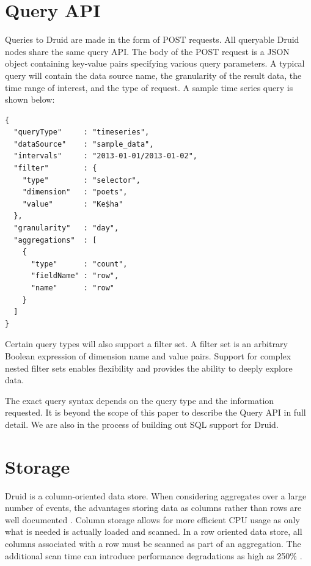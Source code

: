 \documentclass{vldb}
\begin{document}
\section{Query API}
\label{sec:query-api}
Queries to Druid are made in the form of POST requests. All queryable
Druid nodes share the same query API. The body of the POST request is
a JSON object containing key-value pairs specifying various query
parameters. A typical query will contain the data source name, the
granularity of the result data, the time range of interest, and the
type of request.  A sample time series query is shown below:
\begin{verbatim}
{
  "queryType"     : "timeseries",
  "dataSource"    : "sample_data",
  "intervals"     : "2013-01-01/2013-01-02",
  "filter"        : {
    "type"        : "selector",
    "dimension"   : "poets",
    "value"       : "Ke$ha"
  },
  "granularity"   : "day",
  "aggregations"  : [
    {
      "type"      : "count",
      "fieldName" : "row",
      "name"      : "row"
    }
  ]
}
\end{verbatim}

Certain query types will also support a filter set. A filter set is an
arbitrary Boolean expression of dimension name and value
pairs. Support for complex nested filter sets enables flexibility and
provides the ability to deeply explore data.

The exact query syntax depends on the query type and the information requested.
It is beyond the scope of this paper to describe the Query API in full detail.
We are also in the process of building out SQL support for Druid.

\section{Storage}
\label{sec:storage}
Druid is a column-oriented data store. When considering aggregates
over a large number of events, the advantages storing data as columns
rather than rows are well documented \cite{cattell2011scalable}. Column storage allows for
more efficient CPU usage as only what is needed is actually loaded and
scanned. In a row oriented data store, all columns associated with a
row must be scanned as part of an aggregation. The additional scan
time can introduce performance degradations as high as 250\% \cite{bear2012vertica}.
\end{document}
